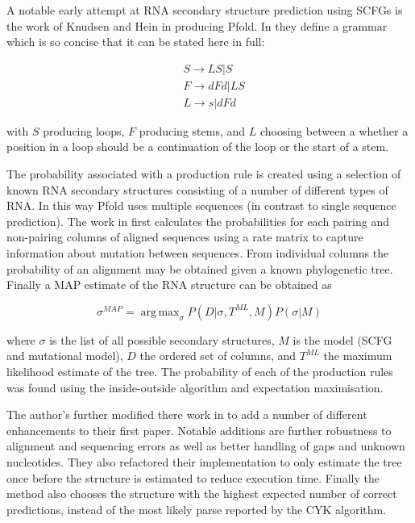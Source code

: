 \documentclass[journal]{IEEEtran}
\DeclareMathOperator*{\argmax}{arg\,max}
\begin{document}
A notable early attempt at RNA secondary structure prediction using SCFGs is the work of Knudsen and Hein \cite{knudsen1999rna, knudsen2003pfold} in producing Pfold. In \cite{knudsen1999rna} they define a grammar which is so concise that it can be stated here in full:

\begin{equation}
\begin{split}
	& S \rightarrow LS | S \\
	& F \rightarrow dFd | LS \\
	& L \rightarrow s | dFd 
\end{split}
\end{equation}

with $S$ producing loops, $F$ producing stems, and $L$ choosing between a whether a position in a loop should be a continuation of the loop or the start of a stem.

The probability associated with a production rule is created using a selection of known RNA secondary structures consisting of a number of different types of RNA. In this way Pfold uses multiple sequences (in contrast to single sequence prediction). The work in \cite{knudsen1999rna} first calculates the probabilities for each pairing and non-pairing columns of aligned sequences using a rate matrix to capture information about mutation between sequences. From individual columns the probability of an alignment may be obtained given a known phylogenetic tree. Finally a MAP estimate of the RNA structure can be obtained as

\begin{equation}
	\sigma^{MAP} = \argmax_{\sigma} P(D | \sigma, T^{ML}, M)P(\sigma | M)
\end{equation}

where $\sigma$ is the list of all possible secondary structures, $M$ is the model (SCFG and mutational model), $D$ the ordered set of columns, and $T^{ML}$ the maximum likelihood estimate of the tree. The probability of each of the production rules was found using the inside-outside algorithm and expectation maximisation.

The author's further modified there work in \cite{knudsen2003pfold} to add a number of different enhancements to their first paper. Notable additions are further robustness to alignment and sequencing errors as well as better handling of gaps and unknown nucleotides. They also refactored their implementation to only estimate the tree once before the structure is estimated to reduce execution time. Finally the method also chooses the structure with the highest expected number of correct predictions, instead of the most likely parse reported by the CYK algorithm.
\end{document}
